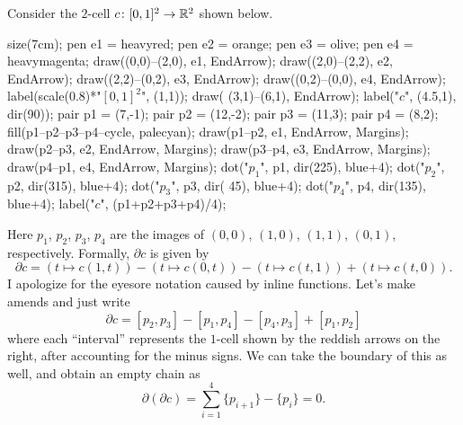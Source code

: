 \begin{example}
	Consider the $2$-cell $c \colon [0,1]^2 \to \mathbb R^2$ shown below.
	\begin{center}
		\begin{asy}
			size(7cm);
			pen e1 = heavyred;
			pen e2 = orange;
			pen e3 = olive;
			pen e4 = heavymagenta;
			draw((0,0)--(2,0), e1, EndArrow);
			draw((2,0)--(2,2), e2, EndArrow);
			draw((2,2)--(0,2), e3, EndArrow);
			draw((0,2)--(0,0), e4, EndArrow);
			label(scale(0.8)*"$[0,1]^2$", (1,1));
			draw( (3,1)--(6,1), EndArrow);
			label("$c$", (4.5,1), dir(90));
			pair p1 = (7,-1);
			pair p2 = (12,-2);
			pair p3 = (11,3);
			pair p4 = (8,2);
			fill(p1--p2--p3--p4--cycle, palecyan);
			draw(p1--p2, e1, EndArrow, Margins);
			draw(p2--p3, e2, EndArrow, Margins);
			draw(p3--p4, e3, EndArrow, Margins);
			draw(p4--p1, e4, EndArrow, Margins);
			dot("$p_1$", p1, dir(225), blue+4);
			dot("$p_2$", p2, dir(315), blue+4);
			dot("$p_3$", p3, dir( 45), blue+4);
			dot("$p_4$", p4, dir(135), blue+4);
			label("$c$", (p1+p2+p3+p4)/4);
		\end{asy}
	\end{center}
	Here $p_1$, $p_2$, $p_3$, $p_4$ are the images of $(0,0)$, $(1,0)$, $(1,1)$, $(0,1)$, respectively.
	Formally, $\partial c$ is given by
	\[ \partial c = (t \mapsto c(1,t)) - (t \mapsto c(0,t))
		- (t \mapsto c(t,1)) + (t \mapsto c(t,0)). \]
	I apologize for the eyesore notation caused by inline functions.
	Let's make amends and just write
	\[ \partial c = [p_2,p_3] - [p_1,p_4] - [p_4,p_3] + [p_1,p_2] \]
	where each ``interval'' represents the $1$-cell shown by the reddish arrows on the right,
	after accounting for the minus signs.
	We can take the boundary of this as well, and obtain an empty chain as
	\[ \partial(\partial c) = \sum_{i=1}^4 \{p_{i+1}\}-\{p_i\} = 0. \]
\end{example}

